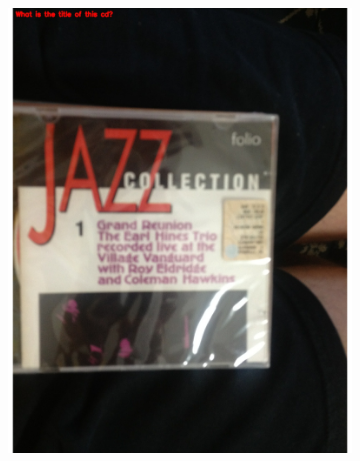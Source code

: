 \documentclass[sigconf]{acmart}
\begin{document}
\begin{figure}[hbp]
\begin{subfigure}[b]{0.3\columnwidth}
                \includegraphics[scale=0.3]{images/reading_2.pdf}  
        \end{subfigure}%
        \begin{subfigure}[b]{0.3\columnwidth}

\end{subfigure}
\end{figure}
\end{document}
